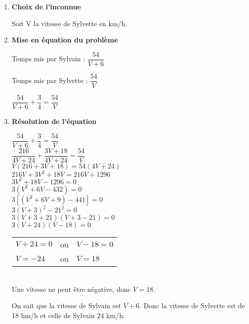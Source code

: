 \begin{enumerate}
\item \textbf{Choix de l'inconnue}

Soit V la vitesse de Sylvette en km/h. \\

\item \textbf{Mise en équation du problème}

Temps mis par Sylvain : $\dfrac{54}{V+6}$

Temps mis par Sylvette : $\dfrac{54}{V}$

$\dfrac{54}{V+6} + \dfrac{3}{4} = \dfrac{54}{V}$ \\

\item \textbf{Résolution de l'équation}

$\dfrac{54}{V+6} + \dfrac{3}{4} = \dfrac{54}{V}$ \\

$\dfrac{216}{4V+24} + \dfrac{3V+18}{4V+24} = \dfrac{54}{V}$ \\

$V\left(216+3V+18\right)=54\left(4V+24\right) $ \\

$ 216V + 3V^2 + 18V = 216V + 1296 $ \\

$ 3V^2 + 18V -1296 = 0 $ \\

$ 3\left(V^2 + 6V - 432\right)=0 $ \\

$ 3\left[\left(V^2 + 6V +9\right) - 441\right] = 0 $ \\

$ 3\left(V+3\right)^2 - 21^2 = 0 $ \\

$ 3\left(V + 3 + 21 \right)\left(V+3-21\right)=0 $ \\

$ 3\left(V+24\right)\left(V-18\right) = 0 $ \\

\begin{tabular}{lcl}
$V+24 = 0$ & ou &$V-18=0$\\
$V=-24$ & ou &$V=18$\\
\end{tabular} \\

Une vitesse ne peut être négative, donc $V=18$.

On sait que la vitesse de Sylvain est $V+6$. Donc la vitesse de Sylvette est de 18 hm/h et celle de Sylvain 24 km/h.
\end{enumerate}


